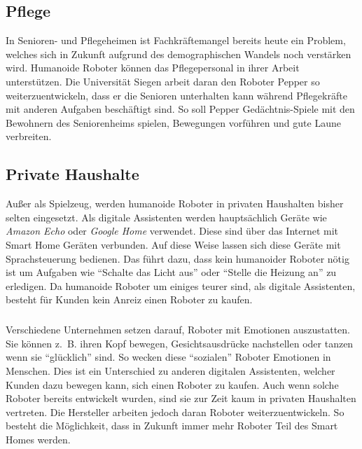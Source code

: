\subsection{Pflege}
In Senioren- und Pflegeheimen ist Fachkräftemangel bereits heute ein Problem,
welches sich in Zukunft aufgrund des demographischen Wandels noch verstärken
wird. Humanoide Roboter können das Pflegepersonal in ihrer Arbeit unterstützen.
Die Universität Siegen arbeit daran den Roboter Pepper so weiterzuentwickeln,
dass er die Senioren unterhalten kann während Pflegekräfte mit anderen Aufgaben
beschäftigt sind. So soll Pepper Gedächtnis-Spiele mit den Bewohnern des
Seniorenheims spielen, Bewegungen vorführen und gute Laune verbreiten. \cite{Frei2017}

\subsection{Private Haushalte}
Außer als Spielzeug, werden humanoide Roboter in privaten Haushalten bisher
selten eingesetzt.
Als digitale Assistenten werden hauptsächlich Geräte wie \emph{Amazon Echo} oder
\emph{Google Home} verwendet. Diese sind über das Internet mit Smart Home
Geräten verbunden. Auf diese Weise lassen sich diese Geräte mit Sprachsteuerung
bedienen. Das führt dazu, dass kein humanoider Roboter nötig ist um Aufgaben wie
"`Schalte das Licht aus"' oder "`Stelle die Heizung an"' zu erledigen. Da
humanoide Roboter um einiges teurer sind, als digitale Assistenten, besteht für
Kunden kein Anreiz einen Roboter zu kaufen.

\subparagraph{}
Verschiedene Unternehmen setzen darauf, Roboter mit Emotionen auszustatten. Sie
können z.~B. ihren Kopf bewegen, Gesichtsausdrücke nachstellen oder tanzen wenn
sie "`glücklich"' sind. So wecken diese "`sozialen"' Roboter Emotionen in
Menschen. Dies ist ein Unterschied zu anderen digitalen Assistenten, welcher
Kunden dazu bewegen kann, sich einen Roboter zu kaufen. Auch wenn solche
Roboter bereits entwickelt wurden, sind sie zur Zeit kaum in privaten Haushalten
vertreten. Die Hersteller arbeiten jedoch daran Roboter weiterzuentwickeln. So
besteht die Möglichkeit, dass in Zukunft immer mehr Roboter Teil des Smart Homes
werden. \cite{Bager2018}

